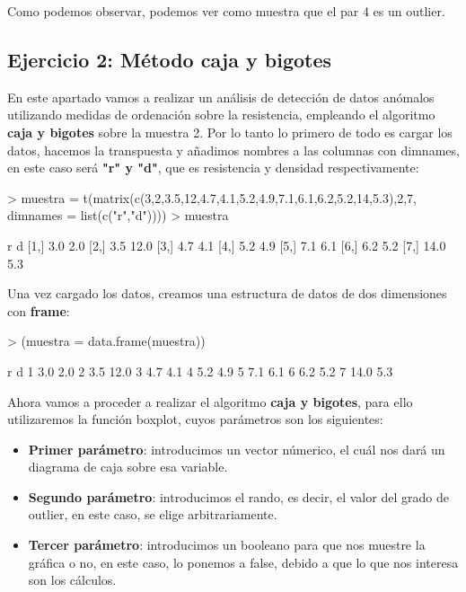 \documentclass [a4paper] {article}
\begin{document}
Como podemos observar, podemos ver como muestra que el par 4 es un outlier.

\subsection{Ejercicio 2: Método caja y bigotes}

En este apartado vamos a realizar un análisis de detección de datos anómalos utilizando medidas de ordenación
sobre la resistencia, empleando el algoritmo \textbf{caja y bigotes} sobre la muestra 2. Por lo tanto
lo primero de todo es cargar los datos, hacemos la transpuesta y añadimos nombres a las columnas con 
dimnames, en este caso será \textbf{"r" y "d"}, que es resistencia y densidad respectivamente:

\begin{Schunk}
\begin{Sinput}
> muestra = t(matrix(c(3,2,3.5,12,4.7,4.1,5.2,4.9,7.1,6.1,6.2,5.2,14,5.3),2,7, dimnames = list(c("r","d"))))
> muestra
\end{Sinput}
\begin{Soutput}
        r    d
[1,]  3.0  2.0
[2,]  3.5 12.0
[3,]  4.7  4.1
[4,]  5.2  4.9
[5,]  7.1  6.1
[6,]  6.2  5.2
[7,] 14.0  5.3
\end{Soutput}
\end{Schunk}

Una vez cargado los datos, creamos una estructura de datos de dos dimensiones con \textbf{frame}:

\begin{Schunk}
\begin{Sinput}
> (muestra = data.frame(muestra))
\end{Sinput}
\begin{Soutput}
     r    d
1  3.0  2.0
2  3.5 12.0
3  4.7  4.1
4  5.2  4.9
5  7.1  6.1
6  6.2  5.2
7 14.0  5.3
\end{Soutput}
\end{Schunk}

Ahora vamos a proceder a realizar el algoritmo \textbf{caja y bigotes}, para ello utilizaremos la
función boxplot, cuyos parámetros son los siguientes:

\begin{itemize} 
	\item \textbf{Primer parámetro}:  introducimos un vector númerico, el cuál nos dará un diagrama
	de caja sobre esa variable.
	\item \textbf{Segundo parámetro}: introducimos el rando, es decir, el valor del grado de outlier,
	en este caso, se elige arbitrariamente.
	\item \textbf{Tercer parámetro}: introducimos un booleano para que nos muestre la gráfica o no,
	en este caso, lo ponemos a false, debido a que lo que nos interesa son los cálculos.
\end{itemize}
\end{document}
